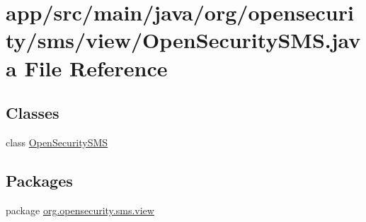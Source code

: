 \hypertarget{a00029}{\section{app/src/main/java/org/opensecurity/sms/view/\+Open\+Security\+S\+M\+S.java File Reference}
\label{a00029}
}
\subsection*{Classes}
\begin{DoxyCompactItemize}
\item 
class \hyperlink{a00010}{Open\+Security\+S\+M\+S}
\end{DoxyCompactItemize}
\subsection*{Packages}
\begin{DoxyCompactItemize}
\item 
package \hyperlink{a00040}{org.\+opensecurity.\+sms.\+view}
\end{DoxyCompactItemize}
